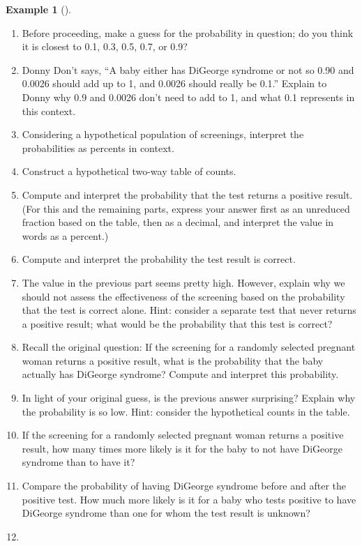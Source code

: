 \documentclass[
  letterpaper,
  DIV=11,
  numbers=noendperiod]{scrreprt}
\providecommand{\tightlist}{%
  \setlength{\itemsep}{0pt}\setlength{\parskip}{0pt}}
\theoremstyle{plain}
\theoremstyle{definition}
\newtheorem{example}{Example}[chapter]
\theoremstyle{definition}
\theoremstyle{definition}
\theoremstyle{remark}
\begin{document}
\begin{tcolorbox}[enhanced jigsaw, opacityback=0, left=2mm, colframe=quarto-callout-note-color-frame, toprule=.15mm, breakable, colback=white, leftrule=.75mm, arc=.35mm, rightrule=.15mm, bottomrule=.15mm]
\begin{example}[]
\begin{enumerate}
\def\labelenumi{\arabic{enumi}.}
\tightlist
\item
  Before proceeding, make a guess for the probability in question; do
  you think it is closest to 0.1, 0.3, 0.5, 0.7, or 0.9?
\item
  Donny Don't says, ``A baby either has DiGeorge syndrome or not so 0.90
  and 0.0026 should add up to 1, and 0.0026 should really be 0.1.''
  Explain to Donny why 0.9 and 0.0026 don't need to add to 1, and what
  0.1 represents in this context.
\item
  Considering a hypothetical population of screenings, interpret the
  probabilities as percents in context.
\item
  Construct a hypothetical two-way table of counts.
\item
  Compute and interpret the probability that the test returns a positive
  result. (For this and the remaining parts, express your answer first
  as an unreduced fraction based on the table, then as a decimal, and
  interpret the value in words as a percent.)
\item
  Compute and interpret the probability the test result is correct.
\item
  The value in the previous part seems pretty high. However, explain why
  we should not assess the effectiveness of the screening based on the
  probability that the test is correct alone. Hint: consider a separate
  test that never returns a positive result; what would be the
  probability that this test is correct?
\item
  Recall the original question: If the screening for a randomly selected
  pregnant woman returns a positive result, what is the probability that
  the baby actually has DiGeorge syndrome? Compute and interpret this
  probability.
\item
  In light of your original guess, is the previous answer surprising?
  Explain why the probability is so low. Hint: consider the hypothetical
  counts in the table.
\item
  If the screening for a randomly selected pregnant woman returns a
  positive result, how many times more likely is it for the baby to not
  have DiGeorge syndrome than to have it?
\item
  Compare the probability of having DiGeorge syndrome before and after
  the positive test. How much more likely is it for a baby who tests
  positive to have DiGeorge syndrome than one for whom the test result
  is unknown?
\item

\end{enumerate}
\end{example}
\end{tcolorbox}
\end{document}
